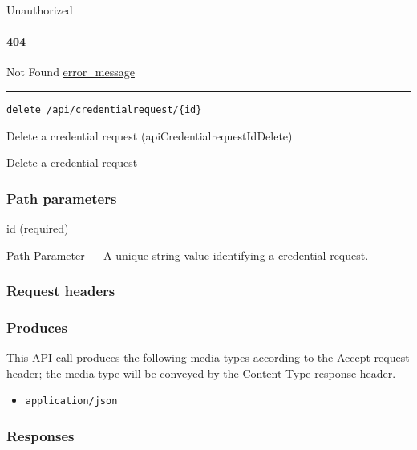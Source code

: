 Unauthorized \protect\hyperlink{}{}

\hypertarget{section-133}{%
\paragraph{404}\label{section-133}}

Not Found \protect\hyperlink{error_message}{error\_message}

\begin{center}\rule{0.5\linewidth}{\linethickness}\end{center}

\protect\hypertarget{apiCredentialrequestIdDelete}{}{}

\begin{verbatim}
delete /api/credentialrequest/{id}
\end{verbatim}

Delete a credential request ({apiCredentialrequestIdDelete})

Delete a credential request

\hypertarget{path-parameters-21}{%
\subsubsection{Path parameters}\label{path-parameters-21}}

id (required)

{Path Parameter} --- A unique string value identifying a credential
request.

\hypertarget{request-headers-20}{%
\subsubsection{Request headers}\label{request-headers-20}}

\hypertarget{produces-40}{%
\subsubsection{Produces}\label{produces-40}}

This API call produces the following media types according to the
{Accept} request header; the media type will be conveyed by the
{Content-Type} response header.

\begin{itemize}
\tightlist
\item
  \texttt{application/json}
\end{itemize}

\hypertarget{responses-40}{%
\subsubsection{Responses}\label{responses-40}}

